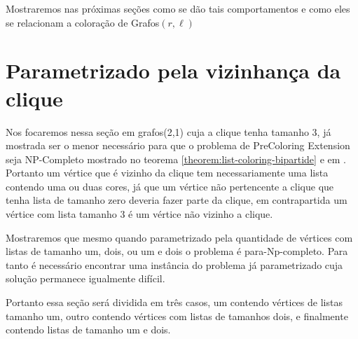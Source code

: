 Mostraremos nas próximas seções como se dão tais comportamentos e como eles se relacionam a coloração de Grafos$(r,\ell)$

\section{Parametrizado pela vizinhança da clique}
Nos focaremos nessa seção em grafos(2,1) cuja a clique tenha tamanho 3, já mostrada ser o menor necessário para que o problema de PreColoring Extension seja NP-Completo mostrado no teorema \ref{theorem:list-coloring-bipartide} e em \cite{kratochvil94,hujter93}. Portanto um vértice que é vizinho da clique tem necessariamente uma lista contendo uma ou duas cores, já que um vértice não pertencente a clique que tenha lista de tamanho zero deveria fazer parte da clique, em contrapartida um vértice com lista tamanho 3 é um vértice não vizinho a clique. 

Mostraremos que mesmo quando parametrizado pela quantidade de vértices com listas de tamanho um, dois, ou um e dois o problema é para-Np-completo. Para tanto é necessário encontrar uma instância do problema já parametrizado cuja solução permanece igualmente difícil.

Portanto essa seção será dividida em três casos, um contendo vértices de listas tamanho um, outro contendo vértices com listas de tamanhos dois, e finalmente contendo listas de tamanho um e dois.
